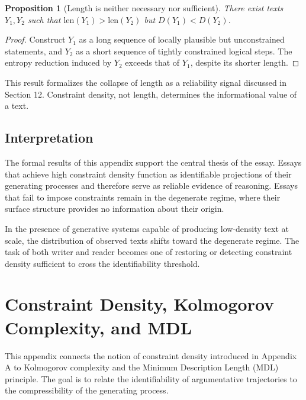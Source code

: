 \documentclass[12pt, oneside]{article}
\theoremstyle{plain}
\newtheorem{proposition}[theorem]{Proposition}
\theoremstyle{definition}
\theoremstyle{remark}
\begin{document}
\begin{proposition}[Length is neither necessary nor sufficient]
There exist texts $Y_1, Y_2$ such that $\text{len}(Y_1) > \text{len}(Y_2)$ but
$D(Y_1) < D(Y_2)$.
\end{proposition}

\begin{proof}
Construct $Y_1$ as a long sequence of locally plausible but unconstrained statements,
and $Y_2$ as a short sequence of tightly constrained logical steps. The entropy
reduction induced by $Y_2$ exceeds that of $Y_1$, despite its shorter length.
\end{proof}

This result formalizes the collapse of length as a reliability signal discussed in
Section 12. Constraint density, not length, determines the informational value of
a text.

\subsection{Interpretation}

The formal results of this appendix support the central thesis of the essay. Essays
that achieve high constraint density function as identifiable projections of their
generating processes and therefore serve as reliable evidence of reasoning. Essays
that fail to impose constraints remain in the degenerate regime, where their surface
structure provides no information about their origin.

In the presence of generative systems capable of producing low-density text at scale,
the distribution of observed texts shifts toward the degenerate regime. The task of
both writer and reader becomes one of restoring or detecting constraint density
sufficient to cross the identifiability threshold.

\section{Constraint Density, Kolmogorov Complexity, and MDL}

This appendix connects the notion of constraint density introduced in Appendix A
to Kolmogorov complexity and the Minimum Description Length (MDL) principle. The
goal is to relate the identifiability of argumentative trajectories to the
compressibility of the generating process.
\end{document}
